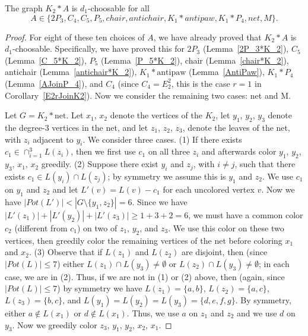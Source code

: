 \begin{lem}
\label{K2ClassificationHelper}
The graph $K_2*A$ is $d_1$-choosable for all 
\[A\in \{2P_3, C_4, C_5, P_5, chair, antichair, K_1*antipaw, K_1*P_4, net, M\}.\]
\end{lem}
\begin{proof}
For eight of these ten choices of $A$, we have already proved that $K_2*A$ is
$d_1$-choosable.  Specifically, we have proved this for 
$2P_3$ (Lemma~\ref{2P_3*K_2}), $C_5$ (Lemma~\ref{C_5*K_2}), $P_5$
(Lemma~\ref{P_5*K_2}), chair (Lemma~\ref{chair*K_2}), antichair
(Lemma~\ref{antichair*K_2}), $K_1*\text{antipaw}$ (Lemma~\ref{AntiPaw}), $K_1*P_4$
(Lemma~\ref{AJoinP_4}), and $C_4$ (since $C_4=E_2^2$, this is the case $r=1$ in
Corollary~\ref{E2rJoinK2}).  Now we consider the remaining two cases: net and M.


Let $G=K_2*\text{net}$.  Let $x_1$, $x_2$ denote the vertices of the $K_2$, let
$y_1$, $y_2$, $y_3$ denote the degree-3 vertices in the net, and let $z_1$,
$z_2$, $z_3$, denote the leaves of the net, with $z_i$ adjacent to $y_i$.  We
consider three cases.  (1) If
there exists $c_1\in\cap_{i=1}^3L(z_i)$, then we first use $c_1$ on all three
$z_i$ and afterwards color $y_1$, $y_2$, $y_3$, $x_1$, $x_2$ greedily. (2)
Suppose there exist $y_i$ and $z_j$, with $i\ne j$, such that there exists
$c_1\in L(y_i)\cap L(z_j)$; by symmetry we assume this is $y_1$ and $z_2$.  We
use $c_1$ on $y_1$ and $z_2$ and let $L'(v)=L(v)-c_1$ for each uncolored vertex
$v$.  Now we have $|Pot(L')| < |G\setminus\{y_1,z_2\}|=6$.  Since we have
$|L'(z_1)|+|L'(y_2)|+|L'(z_3)|\ge 1 + 3 + 2 = 6$, we must have a common color
$c_2$ (different from $c_1$) on two of $z_1$, $y_2$, and $z_3$.  We use this
color on these two vertices, then greedily color the remaining vertices of the
net before coloring $x_1$ and $x_2$. (3) Observe that if $L(z_1)$ and $L(z_2)$
are disjoint, then (since $|Pot(L)|\le 7$) either $L(z_1)\cap L(y_3)\ne
\emptyset$ or $L(z_2)\cap L(y_3)\ne \emptyset$; in each case, we are in (2). 
Thus, if we are not in (1) or (2) above, then
(again, since $|Pot(L)|\le 7$) by symmetry we have $L(z_1)=\{a,b\}$, $L(z_2)=\{a,c\}$, $L(z_3)=\{b,c\}$, and
$L(y_1)=L(y_2)=L(y_3)=\{d,e,f,g\}$.  By symmetry, either $a\notin L(x_1)$ or
$d\notin L(x_1)$.  Thus, we use $a$ on $z_1$ and $z_2$ and we use $d$ on $y_3$.
Now we greedily color $z_3$, $y_1$, $y_2$, $x_2$, $x_1$.


\end{proof}
